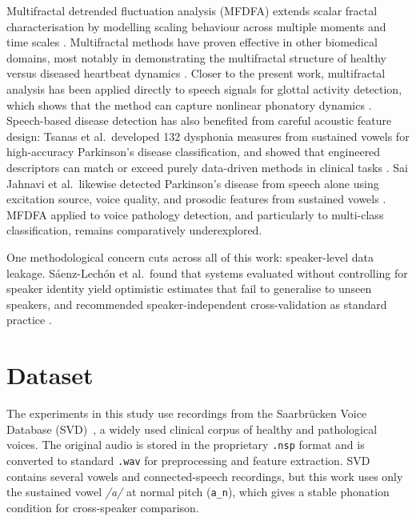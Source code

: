 \documentclass[runningheads]{llncs}
\begin{document}
  Multifractal detrended fluctuation analysis (MFDFA) extends scalar fractal characterisation by modelling scaling behaviour across multiple moments and time scales \cite{mfdfa}. Multifractal methods have proven effective in other biomedical domains, most notably in demonstrating the multifractal structure of healthy versus diseased heartbeat dynamics \cite{ivanov1999}. Closer to the present work, multifractal analysis has been applied directly to speech signals for glottal activity detection, which shows that the method can capture nonlinear phonatory dynamics \cite{lal2020multifractal}. Speech-based disease detection has also benefited from careful acoustic feature design: Tsanas et al.\ developed 132 dysphonia measures from sustained vowels for high-accuracy Parkinson's disease classification, and showed that engineered descriptors can match or exceed purely data-driven methods in clinical tasks \cite{tsanas2012}. Sai Jahnavi et al.\ likewise detected Parkinson's disease from speech alone using excitation source, voice quality, and prosodic features from sustained vowels \cite{jahnavi2020}. MFDFA applied to voice pathology detection, and particularly to multi-class classification, remains comparatively underexplored.

  One methodological concern cuts across all of this work: speaker-level data leakage. Sáenz-Lechón et al.\ found that systems evaluated without controlling for speaker identity yield optimistic estimates that fail to generalise to unseen speakers, and recommended speaker-independent cross-validation as standard practice \cite{saenzlechon2006}.


  \section{Dataset}
  \label{sec:dataset}

  The experiments in this study use recordings from the Saarbrücken Voice Database (SVD)~\cite{svd}, a widely used clinical corpus of healthy and pathological voices. The original audio is stored in the proprietary \texttt{.nsp} format and is converted to standard \texttt{.wav} for preprocessing and feature extraction. SVD contains several vowels and connected-speech recordings, but this work uses only the sustained vowel \textit{/a/} at normal pitch (\texttt{a\_n}), which gives a stable phonation condition for cross-speaker comparison.
\end{document}
